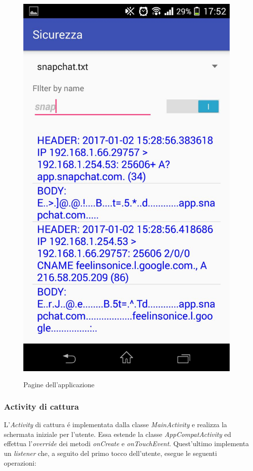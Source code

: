 \documentclass[12pt]{article} %
\begin{document}
\begin{figure}[htbp]
{\includegraphics[scale=0.2]{./activity2active.jpeg}}
\caption{Pagine dell'applicazione\label{fig:apk}}
\end{figure} 
 
\subsubsection{Activity di cattura} %
L'\textit{Activity} di cattura \'e implementata dalla classe \textit{MainActivity} e realizza la schermata iniziale per l'utente. Essa estende la classe \textit{AppCompatActivity} ed effettua l'\textit{override} dei metodi \textit{onCreate} e \textit{onTouchEvent}. Quest'ultimo implementa un \textit{listener} che, a seguito del primo tocco dell'utente, esegue le seguenti operazioni:
\end{document}
